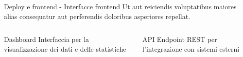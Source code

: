 \documentclass{beamer}
\begin{document}
	\begin{frame}{Deploy e frontend - Interfacce frontend}
		Ut aut reiciendis voluptatibus maiores alias consequatur aut perferendis doloribus asperiores repellat.

		\begin{columns}
			\begin{column}{0.5\textwidth}
				\begin{block}{Dashboard}
					Interfaccia per la visualizzazione dei dati e delle statistiche
				\end{block}
			\end{column}
			\begin{column}{0.5\textwidth}
				\begin{block}{API}
					Endpoint REST per l'integrazione con sistemi esterni
				\end{block}
			\end{column}
		\end{columns}


\end{frame}
\end{document}
